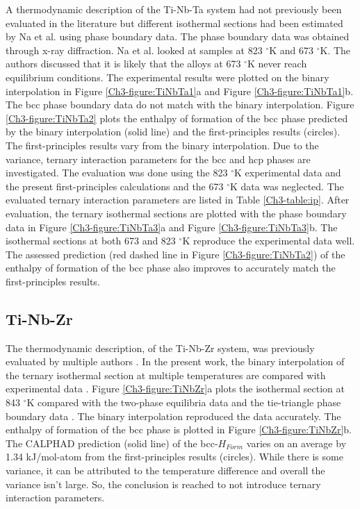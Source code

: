 A thermodynamic description of the Ti-Nb-Ta system had not previously been evaluated in the literature but different isothermal sections had been estimated by Na et al. \cite{Na2001} using phase boundary data. The phase boundary data was obtained through x-ray diffraction. Na et al. \cite{Na2001} looked at samples at 823 $^{\circ}$K and 673 $^{\circ}$K. The authors \cite{Na2001} discussed that it is likely that the alloys at 673 $^{\circ}$K never reach equilibrium conditions. The experimental results \cite{Na2001} were plotted on the binary interpolation in Figure \ref{Ch3-figure:TiNbTa1}a and Figure \ref{Ch3-figure:TiNbTa1}b. The bcc phase boundary data do not match with the binary interpolation. Figure \ref{Ch3-figure:TiNbTa2} plots the enthalpy of formation of the bcc phase predicted by the binary interpolation (solid line) and the first-principles results (circles). The first-principles results vary from the binary interpolation. Due to the variance, ternary interaction parameters for the bcc and hcp phases are investigated. The evaluation was done using the 823 $^{\circ}$K experimental data and the present first-principles calculations and the 673 $^{\circ}$K data was neglected. The evaluated ternary interaction parameters are listed in Table \ref{Ch3-table:ip}. After evaluation, the ternary isothermal sections are plotted with the phase boundary data in Figure \ref{Ch3-figure:TiNbTa3}a and Figure \ref{Ch3-figure:TiNbTa3}b. The isothermal sections at both 673 and 823 $^{\circ}$K reproduce the experimental data \cite{Na2001} well. The assessed prediction (red dashed line in Figure \ref{Ch3-figure:TiNbTa2}) of the enthalpy of formation of the bcc phase also improves to accurately match the first-principles results.

\subsection{Ti-Nb-Zr}

The thermodynamic description, of the Ti-Nb-Zr system, was previously evaluated by multiple authors \cite{Kumar1994a,Tokunaga2007}. In the present work, the binary interpolation of the ternary isothermal section at multiple temperatures are compared with experimental data \cite{Kumar1994a,Tokunaga2007}. Figure \ref{Ch3-figure:TiNbZr}a plots the isothermal section at 843 $^{\circ}$K compared with the two-phase equilibria data and the tie-triangle phase boundary data \cite{Tokunaga2007}. The binary interpolation reproduced the data accurately. The enthalpy of formation of the bcc phase is plotted in Figure \ref{Ch3-figure:TiNbZr}b. The CALPHAD prediction (solid line) of the bcc-$H_{Form}$ varies on an average by 1.34 kJ/mol-atom from the first-principles results (circles). While there is some variance, it can be attributed to the temperature difference and overall the variance isn't large. So, the conclusion is reached to not introduce ternary interaction parameters.  

